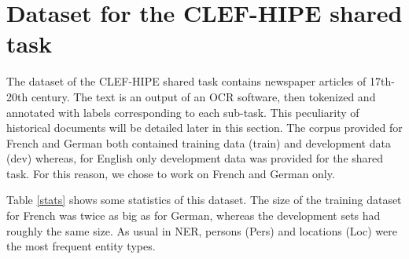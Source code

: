 \section{Dataset for the CLEF-HIPE shared task}
\label{sec:dataset}

The dataset of the CLEF-HIPE shared task contains newspaper articles of 17th-20th century. The text is an output of an OCR software, then tokenized and annotated with labels corresponding to each sub-task. This peculiarity of historical documents will be detailed later in this section. The corpus provided for French and German both contained training data (train) and development data (dev) whereas, for English only development data was provided for the shared task. For this reason, we chose to work on French and German only.

Table \ref{stats} shows some statistics of this dataset. The size of the training dataset for French was twice as big as for German, whereas the development sets had roughly the same size. As usual in NER, persons (Pers) and locations (Loc) were the most frequent entity types.

